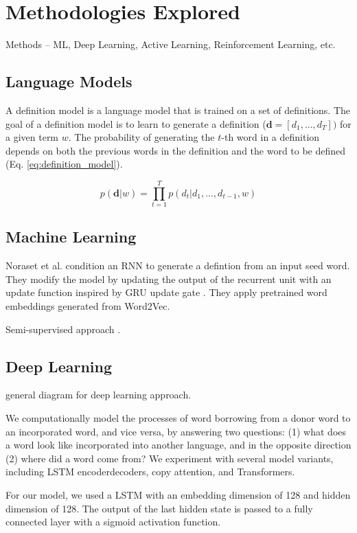 \section{Methodologies Explored}
Methods -- ML, Deep Learning, Active Learning, Reinforcement Learning, etc.

\subsection{Language Models}
A definition model is a language model that is trained on a set of definitions.
The goal of a definition model is to learn to generate a definition %
($\textbf{d} = [d_1, ..., d_T])$ for a given term $w$. The probability of
generating the $t$-th word in a definition depends on both the previous words in
the definition and the word to be defined (Eq. \ref{eq:definition_model}).

\begin{equation}
    \label{eq:definition_model}
    p(\textbf{d} | w) = \prod_{t=1}^{T} p(d_t | d_1,...,d_{t-1}, w)
\end{equation}

\subsection{Machine Learning}
Noraset et al. condition an RNN to generate a defintion from an input seed word.
They modify the model by updating the output of the recurrent unit with an
update function inspired by GRU update gate \cite{noraset_definition_2016}. They
apply pretrained word embeddings generated from Word2Vec.

Semi-supervised approach \cite{patra_bilingual_2019}.

\subsection{Deep Learning}
general diagram for deep learning approach.

\cite{wu_2021_sequence}We computationally model the processes of
word borrowing from a donor word to an incorporated
word, and vice versa, by answering
two questions: (1) what does a word look
like incorporated into another language, and
in the opposite direction (2) where did a word
come from? We experiment with several
model variants, including LSTM encoderdecoders,
copy attention, and Transformers.

\cite{wu_computational_2020} For our model, we used a LSTM with an embedding
dimension of 128 and hidden dimension of 128.
The output of the last hidden state is passed to a fully connected layer with a sigmoid activation function.


